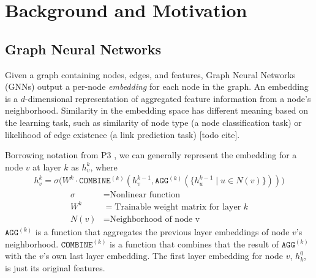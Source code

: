 \chapter{Background and Motivation}

\section{Graph Neural Networks}
Given a graph containing nodes, edges, and features, Graph Neural Networks (GNNs) output a per-node \textit{embedding} for each node in the graph.
An embedding is a $d$-dimensional representation of aggregated feature information from a node's neighborhood. 
Similarity in the embedding space has different meaning based on the learning task, such as similarity of node type (a node classification task) or likelihood of edge existence (a link prediction task) [todo cite]. 


Borrowing notation from P3 \cite{P3_2021}, we can generally represent the embedding for a node $v$ at layer $k$ as $h_v^k$, where
\begin{align} \label{GNN Equation}
    h_v^k = \sigma \biggl(
         W^k \cdot 
         \mathtt{COMBINE}^{(k)} \left(
            h_v^{k-1},
            \mathtt{AGG}^{(k)} \left( 
                    \{ h_u^{k-1} \mid u \in N(v) \}
                \right) 
         \right)
     \biggl)
\end{align}
\begin{align*}
    \sigma &= \text{Nonlinear function} \\
    W^k &= \text{Trainable weight matrix for layer $k$} \\
    N(v) &= \text{Neighborhood of node v}
\end{align*}
$\mathtt{AGG}^{(k)}$ is a function that aggregates the previous layer embeddings of node $v$'s neighborhood. 
$\mathtt{COMBINE}^{(k)}$ is a function that combines that the result of $\mathtt{AGG}^{(k)}$ with the $v$'s own last layer embedding. 
The first layer embedding for node $v$, $h_k^0$, is just its original features.

